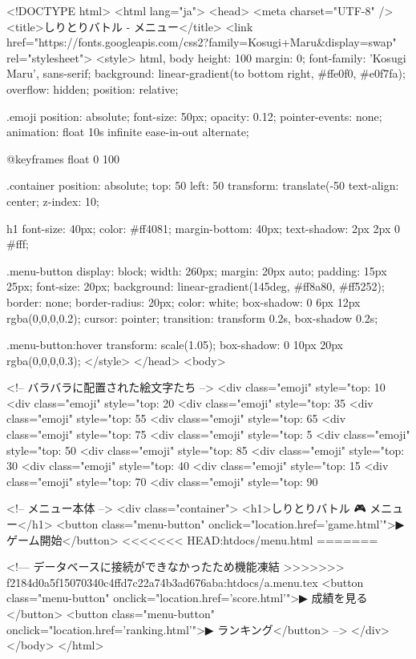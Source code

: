 <!DOCTYPE html>
<html lang="ja">
<head>
  <meta charset="UTF-8" />
  <title>しりとりバトル - メニュー</title>
  <link href="https://fonts.googleapis.com/css2?family=Kosugi+Maru&display=swap" rel="stylesheet">
  <style>
    html, body {
      height: 100%
      margin: 0;
      font-family: 'Kosugi Maru', sans-serif;
      background: linear-gradient(to bottom right, #ffe0f0, #e0f7fa);
      overflow: hidden;
      position: relative;
    }

    .emoji {
      position: absolute;
      font-size: 50px;
      opacity: 0.12;
      pointer-events: none;
      animation: float 10s infinite ease-in-out alternate;
    }

    @keyframes float {
      0%
      100%
    }

    .container {
      position: absolute;
      top: 50%
      left: 50%
      transform: translate(-50%
      text-align: center;
      z-index: 10;
    }

    h1 {
      font-size: 40px;
      color: #ff4081;
      margin-bottom: 40px;
      text-shadow: 2px 2px 0 #fff;
    }

    .menu-button {
      display: block;
      width: 260px;
      margin: 20px auto;
      padding: 15px 25px;
      font-size: 20px;
      background: linear-gradient(145deg, #ff8a80, #ff5252);
      border: none;
      border-radius: 20px;
      color: white;
      box-shadow: 0 6px 12px rgba(0,0,0,0.2);
      cursor: pointer;
      transition: transform 0.2s, box-shadow 0.2s;
    }

    .menu-button:hover {
      transform: scale(1.05);
      box-shadow: 0 10px 20px rgba(0,0,0,0.3);
    }
  </style>
</head>
<body>

  <!-- バラバラに配置された絵文字たち -->
  <div class="emoji" style="top: 10%
  <div class="emoji" style="top: 20%
  <div class="emoji" style="top: 35%
  <div class="emoji" style="top: 55%
  <div class="emoji" style="top: 65%
  <div class="emoji" style="top: 75%
  <div class="emoji" style="top: 5%
  <div class="emoji" style="top: 50%
  <div class="emoji" style="top: 85%
  <div class="emoji" style="top: 30%
  <div class="emoji" style="top: 40%
  <div class="emoji" style="top: 15%
  <div class="emoji" style="top: 70%
  <div class="emoji" style="top: 90%

  <!-- メニュー本体 -->
  <div class="container">
    <h1>しりとりバトル 🎮 メニュー</h1>
    <button class="menu-button" onclick="location.href='game.html'">▶ ゲーム開始</button>
<<<<<<< HEAD:htdocs/menu.html
=======

    <!--- データベースに接続ができなかったため機能凍結
>>>>>>> f2184d0a5f15070340c4ffd7c22a74b3ad676aba:htdocs/a.menu.tex
    <button class="menu-button" onclick="location.href='score.html'">▶ 成績を見る</button>
    <button class="menu-button" onclick="location.href='ranking.html'">▶ ランキング</button> -->
  </div>
</body>
</html>
